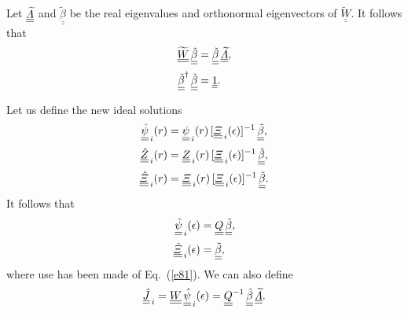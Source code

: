 \documentclass[12pt,prb,aps,notitlepage]{revtex4-1}
\begin{document}
Let 
  $\underline{\underline{\widetilde{\mit\Lambda}}}$
  and $\underline{\underline{\tilde{\beta}}}$ be the real eigenvalues and orthonormal eigenvectors of $\underline{\underline{\widetilde{W}}}$. 
   It follows that 
 \begin{align}
\underline{\underline{\widetilde{W}}}\,\underline{\underline{\tilde{\beta}}}&=\underline{\underline{\tilde{\beta}}}\,\underline{\underline{\widetilde{\mit\Lambda}}},\\[0.5ex]
\underline{\underline{\tilde{\beta}}}^\dag\,\underline{\underline{\tilde{\beta}}}&= \underline{\underline{1}}.
\end{align}

Let us define the new ideal solutions
\begin{align}
\underline{\underline{\hat{\psi}}}_{\,i}(r)&=\underline{\underline{\psi}}_{\,i}(r)\,[\underline{\underline{\mit\Xi}}_{\,i}(\epsilon)]^{-1}\,\underline{\underline{\tilde{\beta}}},\\[0.5ex]
\underline{\underline{\hat{Z}}}_{\,i}(r)   &=\underline{\underline{Z}}_{\,i}(r)\,[\underline{\underline{\mit\Xi}}_{\,i}(\epsilon)]^{-1}\,\underline{\underline{\tilde{\beta}}},\\[0.5ex]
\underline{\underline{\hat{\mit\Xi}}}_{\,i}(r)   &=\underline{\underline{\mit\Xi}}_{\,i}(r)\,[\underline{\underline{\mit\Xi}}_{\,i}(\epsilon)]^{-1}\,\underline{\underline{\tilde{\beta}}}.
\end{align}
It follows that
\begin{align}
\underline{\underline{\hat{\psi}}}_{\,i}(\epsilon)&=\underline{\underline{Q}}\,\underline{\underline{\tilde{\beta}}},\\[0.5ex]
\underline{\underline{\hat{\mit\Xi}}}_{\,i}(\epsilon)&=\underline{\underline{\tilde{\beta}}},
\end{align}
where use has been made of Eq.~(\ref{e81}). 
We can also define
\begin{equation}
\underline{\underline{\hat{J}}}_{\,i}=\underline{\underline{W}}\,\underline{\underline{\hat{\psi}}}_{\,i}(\epsilon)= \underline{\underline{Q}}^{-1}\,\underline{\underline{\tilde{\beta}}}\,
\underline{\underline{\widetilde{\mit\Lambda}}}.
\end{equation}
\end{document}
